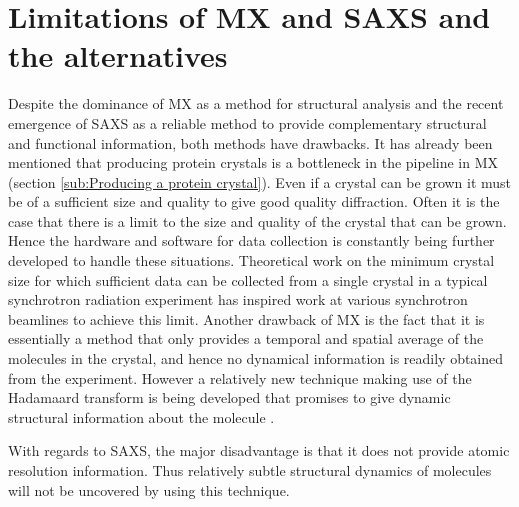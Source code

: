 \section{Limitations of MX and SAXS and the alternatives}
\label{sec:Limitations and alternatives to MX and SAXS}
    Despite the dominance of MX as a method for structural analysis and the recent emergence of SAXS as a reliable method to provide complementary structural and functional information, both methods have drawbacks.
    It has already been mentioned that producing protein crystals is a bottleneck in the pipeline in MX (section \ref{sub:Producing a protein crystal}).
    Even if a crystal can be grown it must be of a sufficient size and quality to give good quality diffraction.
    Often it is the case that there is a limit to the size and quality of the crystal that can be grown.
    Hence the hardware and software for data collection is constantly being further developed to handle these situations.
    Theoretical work on the minimum crystal size for which sufficient data can be collected from a single crystal in a typical synchrotron radiation experiment \cite{holton2010} has inspired work at various synchrotron beamlines to achieve this limit.
    Another drawback of MX is the fact that it is essentially a method that only provides a temporal and spatial average of the molecules in the crystal, and hence no dynamical information is readily obtained from the experiment.
    However a relatively new technique making use of the Hadamaard transform is being developed that promises to give dynamic structural information about the molecule \cite{yorke2014time}.

    With regards to SAXS, the major disadvantage is that it does not provide atomic resolution information.
    Thus relatively subtle structural dynamics of molecules will not be uncovered by using this technique.

